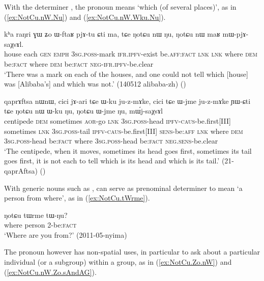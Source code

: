 With the determiner , the pronoun  means `which (of several places)', as in (\ref{ex:NotCu.nW.Nu}) and (\ref{ex:NotCu.nW.Wku.Nu}).

\begin{exe}
\ex \label{ex:NotCu.nW.Nu}
\gll kʰa raŋri ɣɯ ʑo ɯ-ftaʁ pjɤ-tu ɕti ma, tɕe ŋotɕu nɯ ŋu, ŋotɕu nɯ maʁ mɯ-pjɤ-saχsɤl. \\
house each \textsc{gen} \textsc{emph} \textsc{3sg}.\textsc{poss}-mark \textsc{ifr}.\textsc{ipfv}-exist be.\textsc{aff}:\textsc{fact} \textsc{lnk} \textsc{lnk} where \textsc{dem} be:\textsc{fact}  where \textsc{dem} be:\textsc{fact} \textsc{neg}-\textsc{ifr}.\textsc{ipfv}-be.clear \\
\glt `There was a mark on each of the houses, and one could not tell which [house] was [Alibaba's] and which was not.' (140512 alibaba-zh) ()
\end{exe} 

\begin{exe}
\ex \label{ex:NotCu.nW.Wku.Nu}
\gll qaprɤftsa nɯnɯ, cici jɤ-ari tɕe ɯ-ku ju-z-mɤke, cici tɕe ɯ-jme ju-z-mɤke ɲɯ-ɕti tɕe ŋotɕu nɯ ɯ-ku ŋu, ŋotɕu ɯ-jme ŋu, mɯ́j-saχsɤl \\
centipede \textsc{dem} sometimes \textsc{aor}-go \textsc{lnk} \textsc{3sg}.\textsc{poss}-head \textsc{ipfv}-\textsc{caus}-be.first[III] sometimes \textsc{lnk} \textsc{3sg}.\textsc{poss}-tail \textsc{ipfv}-\textsc{caus}-be.first[III] \textsc{sens}-be:\textsc{aff} \textsc{lnk} where \textsc{dem} \textsc{3sg}.\textsc{poss}-head be:\textsc{fact} where \textsc{3sg}.\textsc{poss}-head be:\textsc{fact} \textsc{neg}.\textsc{sens}-be.clear \\
\glt `The centipede, when it moves, sometimes its head goes first, sometimes its tail goes first, it is not each to tell which is its head and which is its tail.' (21-qaprAftsa)
()
\end{exe} 


With generic nouns such as ,  can serve as prenominal determiner to mean `a person from where', as in (\ref{ex:NotCu.tWrme}).

\begin{exe}
\ex \label{ex:NotCu.tWrme}
\gll ŋotɕu tɯrme tɯ-ŋu? \\
where person 2-be:\textsc{fact} \\
\glt `Where are you from?' (2011-05-nyima)
\end{exe} 

The pronoun  however has non-spatial uses, in particular to ask about a particular individual (or a subgroup) within a group, as in (\ref{ex:NotCu.Zo.nW}) and (\ref{ex:NotCu.nW.Zo.sAndAG}).

